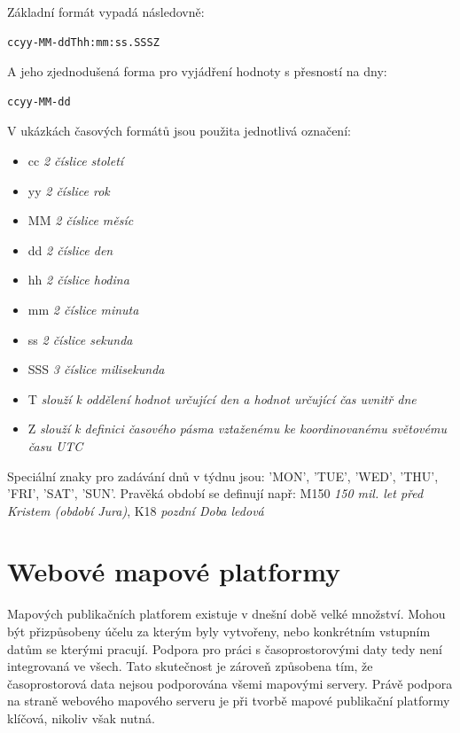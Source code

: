 \noindent
Základní formát vypadá následovně:

\begin{verbatim}
ccyy-MM-ddThh:mm:ss.SSSZ
\end{verbatim}

\noindent
A jeho zjednodušená forma pro vyjádření hodnoty s přesností na dny:

\begin{verbatim}
ccyy-MM-dd
\end{verbatim}

\noindent
V ukázkách časových formátů jsou použita jednotlivá označení:

\begin{itemize}
	\item cc \textit{2 číslice století}
	\item yy \textit{2 číslice rok}
	\item MM \textit{2 číslice měsíc}
	\item dd \textit{2 číslice den}
	\item hh \textit{2 číslice hodina}
	\item mm \textit{2 číslice minuta}
	\item ss \textit{2 číslice sekunda}
	\item SSS \textit{3 číslice milisekunda}
\end{itemize}

\begin{itemize}
	\item T \textit{slouží k oddělení hodnot určující den a hodnot určující čas uvnitř dne}
	\item Z \textit{slouží k definici časového pásma vztaženému ke koordinovanému světovému času UTC}
\end{itemize}

Speciální znaky pro zadávání dnů v týdnu jsou: 'MON', 'TUE', 'WED',
'THU', 'FRI', 'SAT', 'SUN'. Pravěká období se definují např: M150
\textit{150 mil. let před Kristem (období Jura)}, K18 \textit{pozdní
  Doba ledová}

\newpage
\section{Webové mapové platformy}
\label{ssec:mapove-platformy}

Mapových publikačních platforem existuje v dnešní době velké
množství. Mohou být přizpůsobeny účelu za kterým byly vytvořeny, nebo
konkrétním vstupním datům se kterými pracují. Podpora pro práci s časoprostorovými daty tedy není integrovaná ve všech. Tato
skutečnost je zároveň způsobena tím, že časoprostorová data nejsou
podporována všemi mapovými servery. Právě podpora na straně webového
mapového serveru je při tvorbě mapové publikační platformy
klíčová, nikoliv však nutná.
 
